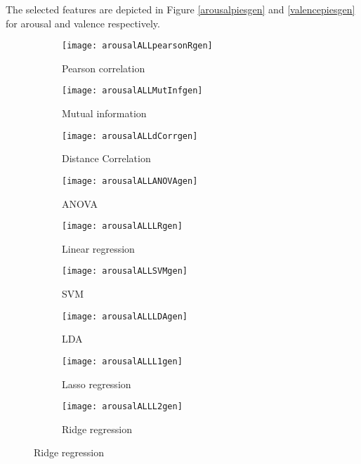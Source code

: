 The selected features are depicted in Figure \ref{arousalpiesgen} and \ref{valencepiesgen} for arousal and valence respectively.

\clearpage
\begin{figure}[!tbp]
  \centering
  \begin{subfigure}[b]{0.3\textwidth}
    \texttt{[image: arousalALLpearsonRgen]}
    \caption{Pearson correlation}
  \end{subfigure}
  \hfill
  \begin{subfigure}[b]{0.3\textwidth}
    \texttt{[image: arousalALLMutInfgen]}
    \caption{Mutual information}
  \end{subfigure}
  \hfill
  \begin{subfigure}[b]{0.3\textwidth}
    \texttt{[image: arousalALLdCorrgen]}
    \caption{Distance Correlation}
  \end{subfigure}
  
  \begin{subfigure}[b]{0.3\textwidth}
    \texttt{[image: arousalALLANOVAgen]}
    \caption{ANOVA}
  \end{subfigure}
  \hfill
  \begin{subfigure}[b]{0.3\textwidth}
    \texttt{[image: arousalALLLRgen]}
    \caption{Linear regression}
  \end{subfigure}
  \hfill
  \begin{subfigure}[b]{0.3\textwidth}
    \texttt{[image: arousalALLSVMgen]}
    \caption{SVM}
  \end{subfigure}
  
  \begin{subfigure}[b]{0.3\textwidth}
    \texttt{[image: arousalALLLDAgen]}
    \caption{LDA}
  \end{subfigure}
  \hfill
  \begin{subfigure}[b]{0.3\textwidth}
    \texttt{[image: arousalALLL1gen]}
    \caption{Lasso regression}
  \end{subfigure}
  \hfill
  \begin{subfigure}[b]{0.3\textwidth}
    \texttt{[image: arousalALLL2gen]}
    \caption{Ridge regression}
  \end{subfigure}
  

\end{figure}
